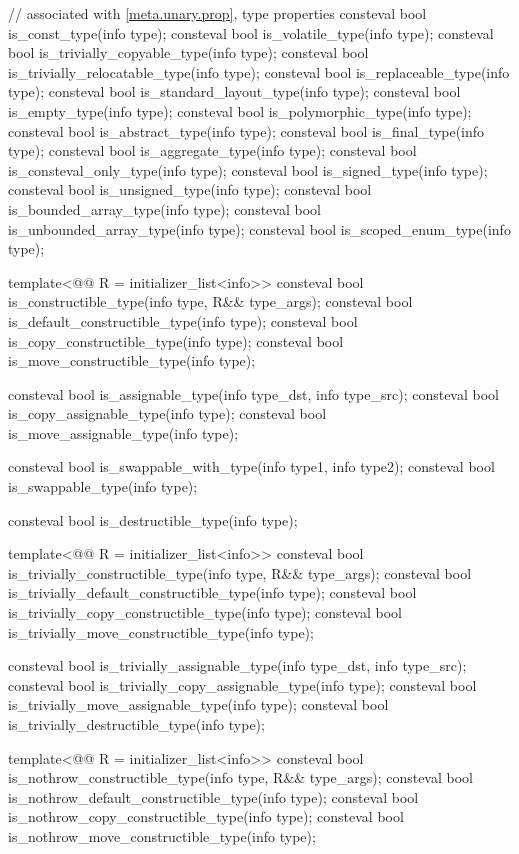 \begin{codeblock}
{  // associated with \ref{meta.unary.prop}, type properties
  consteval bool is_const_type(info type);
  consteval bool is_volatile_type(info type);
  consteval bool is_trivially_copyable_type(info type);
  consteval bool is_trivially_relocatable_type(info type);
  consteval bool is_replaceable_type(info type);
  consteval bool is_standard_layout_type(info type);
  consteval bool is_empty_type(info type);
  consteval bool is_polymorphic_type(info type);
  consteval bool is_abstract_type(info type);
  consteval bool is_final_type(info type);
  consteval bool is_aggregate_type(info type);
  consteval bool is_consteval_only_type(info type);
  consteval bool is_signed_type(info type);
  consteval bool is_unsigned_type(info type);
  consteval bool is_bounded_array_type(info type);
  consteval bool is_unbounded_array_type(info type);
  consteval bool is_scoped_enum_type(info type);

  template<@@ R = initializer_list<info>>
    consteval bool is_constructible_type(info type, R&& type_args);
  consteval bool is_default_constructible_type(info type);
  consteval bool is_copy_constructible_type(info type);
  consteval bool is_move_constructible_type(info type);

  consteval bool is_assignable_type(info type_dst, info type_src);
  consteval bool is_copy_assignable_type(info type);
  consteval bool is_move_assignable_type(info type);

  consteval bool is_swappable_with_type(info type1, info type2);
  consteval bool is_swappable_type(info type);

  consteval bool is_destructible_type(info type);

  template<@@ R = initializer_list<info>>
    consteval bool is_trivially_constructible_type(info type, R&& type_args);
  consteval bool is_trivially_default_constructible_type(info type);
  consteval bool is_trivially_copy_constructible_type(info type);
  consteval bool is_trivially_move_constructible_type(info type);

  consteval bool is_trivially_assignable_type(info type_dst, info type_src);
  consteval bool is_trivially_copy_assignable_type(info type);
  consteval bool is_trivially_move_assignable_type(info type);
  consteval bool is_trivially_destructible_type(info type);

  template<@@ R = initializer_list<info>>
    consteval bool is_nothrow_constructible_type(info type, R&& type_args);
  consteval bool is_nothrow_default_constructible_type(info type);
  consteval bool is_nothrow_copy_constructible_type(info type);
  consteval bool is_nothrow_move_constructible_type(info type);

}
\end{codeblock}

